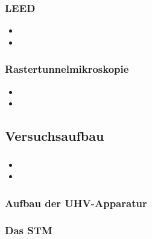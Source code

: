 \documentclass{beamer}
\begin{document}
\begin{frame}
\frametitle{LEED}
\begin{itemize}
  \item
  \item
\end{itemize}
\end{frame}


\begin{frame}
\frametitle{Rastertunnelmikroskopie}
\begin{itemize}
  \item
  \item
\end{itemize}
\end{frame}



\subsection[Versuchsaufbau]{Versuchsaufbau}

\begin{frame}
\frametitle{}
\begin{itemize}
  \item
  \item
\end{itemize}
\end{frame}

\begin{frame}
\frametitle{Aufbau der UHV-Apparatur}
\begin{figure}[H]
\centering
\sffamily

\end{figure}
\end{frame}

\begin{frame}
\frametitle{Das STM}
\begin{figure}[H]
\centering
\sffamily

\end{figure}
\end{frame}

\end{document}
